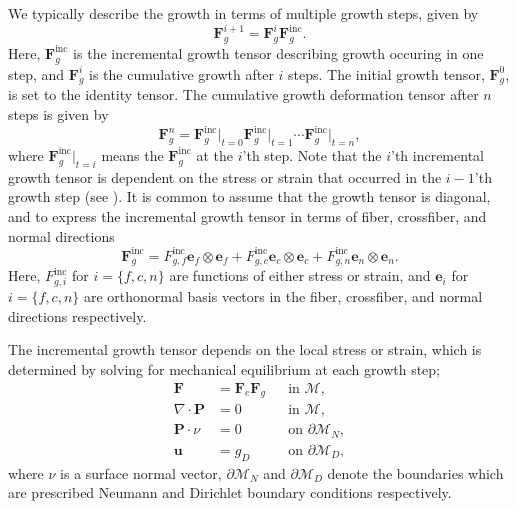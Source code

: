 We typically describe the growth in terms of multiple growth steps, given by
\begin{equation*}
    \mathbf{F}_g^{i + 1} = \mathbf{F}_g^i\mathbf{F}_g^\mathrm{inc} .
\end{equation*}
Here, $\mathbf{F}_g^\mathrm{inc}$ is the incremental growth tensor describing growth occuring in one step, and $\mathbf{F}_g^i$ is the cumulative growth after $i$ steps. The initial growth tensor, $\mathbf{F}_g^0$, is set to the identity tensor. The cumulative growth deformation tensor after $n$ steps is given by
\begin{equation*}
    \mathbf{F}_g^{n} = \mathbf{F}_{g}^\mathrm{inc}\vert_{t=0}\mathbf{F}_{g}^\mathrm{inc}\vert_{t=1} \cdots \mathbf{F}_{g}^\mathrm{inc}\vert_{t=n},
\end{equation*}  
where $\mathbf{F}_{g}^\mathrm{inc}\vert_{t=i}$ means the $\mathbf{F}_{g}^\mathrm{inc}$ at the $i$'th step. Note that the $i$'th incremental growth tensor is dependent on the stress or strain that occurred in the $i-1$'th growth step (see \citep{Goriely2007}). It is common to assume that the growth tensor is diagonal, and to express the incremental growth tensor in terms of fiber, crossfiber, and normal directions 
\begin{equation*}
    \mathbf{F}_g^\mathrm{inc} = F^\mathrm{inc}_{g,f}\mathbf{e}_f\otimes \mathbf{e}_f + F^\mathrm{inc}_{g,c}\mathbf{e}_c\otimes \mathbf{e}_c + F^\mathrm{inc}_{g,n}\mathbf{e}_n\otimes \mathbf{e}_n.
\end{equation*}
Here, $F^\mathrm{inc}_{g, i}$ for  $i = \{f, c, n\}$ are functions of either stress or strain, and $\mathbf{e}_i$ for $i = {\{f, c, n\}}$ are orthonormal basis vectors in the fiber, crossfiber, and normal directions respectively. 

The incremental growth tensor depends on the local stress or strain, which is determined by solving for mechanical equilibrium at each growth step; 
\begin{equation} \label{eq: system of equations}
\begin{aligned}
    \mathbf{F} & = \mathbf{F}_e\mathbf{F}_g && \text{in } \mathcal{M} ,\\
    \nabla\cdot\mathbf{P} & = 0 && \text{in } \mathcal{M}, \\
    \mathbf{P}\cdot \nu & = 0 && \text{on } \partial\mathcal{M}_N, \\
    \mathbf{u} & = g_D && \text{on } \partial\mathcal{M}_D,
\end{aligned}
\end{equation} 
where $\nu$ is a surface normal vector, $\partial\mathcal{M}_N$ and $\partial\mathcal{M}_D$ denote the boundaries which are prescribed Neumann and Dirichlet boundary conditions respectively. 

